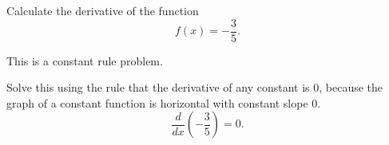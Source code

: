 \documentclass{ximera}
\author{Emma Smith Zbarsky}
\begin{document}
\begin{exercise}

Calculate the derivative of the function \[f(x) = -\frac{3}{5}.\]


\begin{hint}
This is a constant rule problem.
\end{hint}


\begin{hint}
Solve this using the rule that the derivative of any constant is 0,
because the graph of a constant function is horizontal with constant
slope 0. \[ \frac{d}{dx}\left(-\frac{3}{5}\right) = \boxed{0}.\]
\end{hint}


\begin{multipleChoice}
\end{multipleChoice}

\end{exercise}
\end{document}

